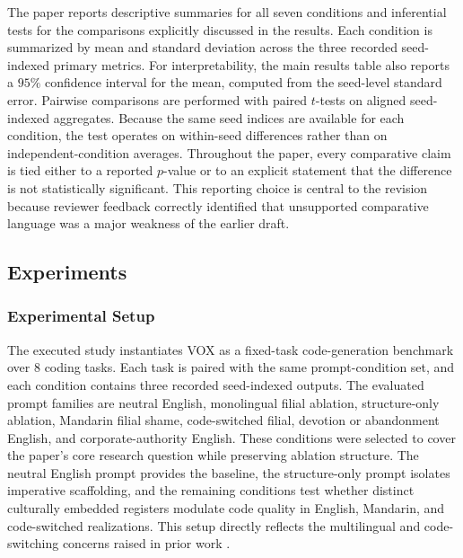 \documentclass{article}
\begin{document}
The paper reports descriptive summaries for all seven conditions and inferential tests for the comparisons explicitly discussed in the results. Each condition is summarized by mean and standard deviation across the three recorded seed-indexed primary metrics. For interpretability, the main results table also reports a \(95\%\) confidence interval for the mean, computed from the seed-level standard error. Pairwise comparisons are performed with paired \(t\)-tests on aligned seed-indexed aggregates. Because the same seed indices are available for each condition, the test operates on within-seed differences rather than on independent-condition averages. Throughout the paper, every comparative claim is tied either to a reported \(p\)-value or to an explicit statement that the difference is not statistically significant. This reporting choice is central to the revision because reviewer feedback correctly identified that unsupported comparative language was a major weakness of the earlier draft.

\subsection{Experiments}

\label{sec:experiments}

\subsubsection{Experimental Setup}

\label{sec:experimental_setup}

The executed study instantiates VOX as a fixed-task code-generation benchmark over 8 coding tasks. Each task is paired with the same prompt-condition set, and each condition contains three recorded seed-indexed outputs. The evaluated prompt families are neutral English, monolingual filial ablation, structure-only ablation, Mandarin filial shame, code-switched filial, devotion or abandonment English, and corporate-authority English. These conditions were selected to cover the paper's core research question while preserving ablation structure. The neutral English prompt provides the baseline, the structure-only prompt isolates imperative scaffolding, and the remaining conditions test whether distinct culturally embedded registers modulate code quality in English, Mandarin, and code-switched realizations. This setup directly reflects the multilingual and code-switching concerns raised in prior work \cite{blasi2022overreliance, conneau2020emerging, qin2020cosdaml, zhang2023multilingual}.
\end{document}
